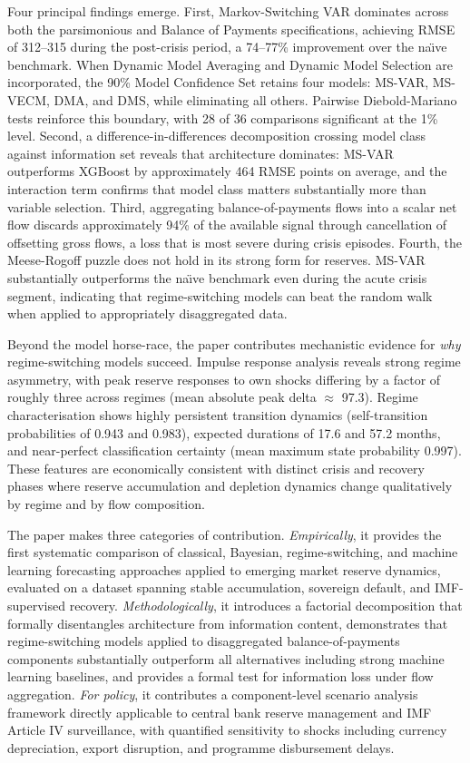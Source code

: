 \documentclass[12pt,a4paper]{article}
\begin{document}
Four principal findings emerge. First, Markov-Switching VAR dominates across both the parsimonious and Balance of Payments specifications, achieving RMSE of 312--315 during the post-crisis period, a 74--77\% improvement over the na\"{\i}ve benchmark. When Dynamic Model Averaging and Dynamic Model Selection are incorporated, the 90\% Model Confidence Set retains four models: MS-VAR, MS-VECM, DMA, and DMS, while eliminating all others. Pairwise Diebold-Mariano tests reinforce this boundary, with 28 of 36 comparisons significant at the 1\% level. Second, a difference-in-differences decomposition crossing model class against information set reveals that architecture dominates: MS-VAR outperforms XGBoost by approximately 464 RMSE points on average, and the interaction term confirms that model class matters substantially more than variable selection. Third, aggregating balance-of-payments flows into a scalar net flow discards approximately 94\% of the available signal through cancellation of offsetting gross flows, a loss that is most severe during crisis episodes. Fourth, the Meese-Rogoff puzzle does not hold in its strong form for reserves. MS-VAR substantially outperforms the na\"{\i}ve benchmark even during the acute crisis segment, indicating that regime-switching models can beat the random walk when applied to appropriately disaggregated data.

Beyond the model horse-race, the paper contributes mechanistic evidence for \textit{why} regime-switching models succeed. Impulse response analysis reveals strong regime asymmetry, with peak reserve responses to own shocks differing by a factor of roughly three across regimes (mean absolute peak delta $\approx$ 97.3). Regime characterisation shows highly persistent transition dynamics (self-transition probabilities of 0.943 and 0.983), expected durations of 17.6 and 57.2 months, and near-perfect classification certainty (mean maximum state probability 0.997). These features are economically consistent with distinct crisis and recovery phases where reserve accumulation and depletion dynamics change qualitatively by regime and by flow composition.

The paper makes three categories of contribution. \textit{Empirically}, it provides the first systematic comparison of classical, Bayesian, regime-switching, and machine learning forecasting approaches applied to emerging market reserve dynamics, evaluated on a dataset spanning stable accumulation, sovereign default, and IMF-supervised recovery. \textit{Methodologically}, it introduces a factorial decomposition that formally disentangles architecture from information content, demonstrates that regime-switching models applied to disaggregated balance-of-payments components substantially outperform all alternatives including strong machine learning baselines, and provides a formal test for information loss under flow aggregation. \textit{For policy}, it contributes a component-level scenario analysis framework directly applicable to central bank reserve management and IMF Article IV surveillance, with quantified sensitivity to shocks including currency depreciation, export disruption, and programme disbursement delays.
\end{document}
